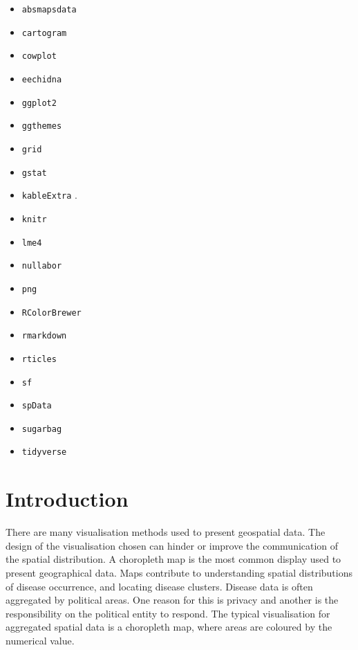 \documentclass{monashthesis}
\begin{document}
\begin{itemize}
\tightlist
\item
  \texttt{absmapsdata} \autocite{ABSmaps}
\item
  \texttt{cartogram} \autocite{cartogram}
\item
  \texttt{cowplot} \autocite{cowplot}
\item
  \texttt{eechidna} \autocite{eechidna}
\item
  \texttt{ggplot2} \autocite{ggplot2}
\item
  \texttt{ggthemes} \autocite{ggthemes}
\item
  \texttt{grid} \autocite{grid}
\item
  \texttt{gstat} \autocite{gstat}
\item
  \texttt{kableExtra} \autocite{kableExtra}.
\item
  \texttt{knitr} \autocite{knitr}
\item
  \texttt{lme4} \autocite{lme4}
\item
  \texttt{nullabor} \autocite{nullabor}
\item
  \texttt{png} \autocite{png}
\item
  \texttt{RColorBrewer} \autocite{RColorBrewer}
\item
  \texttt{rmarkdown} \autocite{rmarkdown}
\item
  \texttt{rticles} \autocite{rticles}
\item
  \texttt{sf} \autocite{sf}
\item
  \texttt{spData} \autocite{spData}
\item
  \texttt{sugarbag} \autocite{sugarbag}
\item
  \texttt{tidyverse} \autocite{tidyverse}
\end{itemize}

\hypertarget{ch:intro}{%
\chapter{Introduction}\label{ch:intro}}

There are many visualisation methods used to present geospatial data. The design of the visualisation chosen can hinder or improve the communication of the spatial distribution. A choropleth map is the most common display used to present geographical data. Maps contribute to understanding spatial distributions of disease occurrence, and locating disease clusters. Disease data is often aggregated by political areas. One reason for this is privacy and another is the responsibility on the political entity to respond. The typical visualisation for aggregated spatial data is a choropleth map, where areas are coloured by the numerical value.
\end{document}

